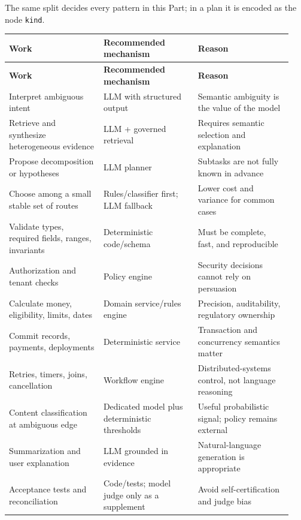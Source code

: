 The same split decides every pattern in this Part; in a plan it is encoded as the node \lstinline[style=bookinline]!kind!.\par

\BookTableStart
\small
\begin{longtable}{@{}Y{0.3133\linewidth}Y{0.3133\linewidth}Y{0.3133\linewidth}@{}}
\color{white}\bfseries \textbf{Work} & \color{white}\bfseries \textbf{Recommended mechanism} & \color{white}\bfseries \textbf{Reason} \\
\endfirsthead
{}
\color{white}\bfseries \textbf{Work} & \color{white}\bfseries \textbf{Recommended mechanism} & \color{white}\bfseries \textbf{Reason} \\
\endhead
Interpret ambiguous intent & LLM with structured output & Semantic ambiguity is the value of the model \\
Retrieve and synthesize heterogeneous evidence & LLM + governed retrieval & Requires semantic selection and explanation \\
Propose decomposition or hypotheses & LLM planner & Subtasks are not fully known in advance \\
Choose among a small stable set of routes & Rules/classifier first; LLM fallback & Lower cost and variance for common cases \\
Validate types, required fields, ranges, invariants & Deterministic code/schema & Must be complete, fast, and reproducible \\
Authorization and tenant checks & Policy engine & Security decisions cannot rely on persuasion \\
Calculate money, eligibility, limits, dates & Domain service/rules engine & Precision, auditability, regulatory ownership \\
Commit records, payments, deployments & Deterministic service & Transaction and concurrency semantics matter \\
Retries, timers, joins, cancellation & Workflow engine & Distributed-systems control, not language reasoning \\
Content classification at ambiguous edge & Dedicated model plus deterministic thresholds & Useful probabilistic signal; policy remains external \\
Summarization and user explanation & LLM grounded in evidence & Natural-language generation is appropriate \\
Acceptance tests and reconciliation & Code/tests; model judge only as a supplement & Avoid self-certification and judge bias \\
\end{longtable}
\BookTableEnd

